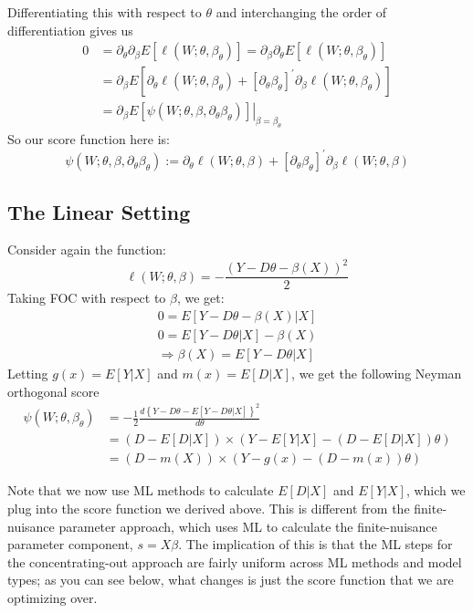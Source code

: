 \documentclass[11pt]{article}
\begin{document}
Differentiating this with respect to $\theta$ and interchanging the order of differentiation gives us
$$\begin{aligned}
0 &=\partial_{\theta} \partial_{\beta} E\left[\ell\left(W ; \theta, \beta_{\theta}\right)\right]=\partial_{\beta} \partial_{\theta} E\left[\ell\left(W ; \theta, \beta_{\theta}\right)\right] \\
&=\partial_{\beta} E\left[\partial_{\theta} \ell\left(W ; \theta, \beta_{\theta}\right)+\left[\partial_{\theta} \beta_{\theta}\right]^{\prime} \partial_{\beta} \ell\left(W ; \theta, \beta_{\theta}\right)\right] \\
&=\left.\partial_{\beta} E\left[\psi\left(W ; \theta, \beta, \partial_{\theta} \beta_{\theta}\right)\right]\right|_{\beta=\beta_{\theta}}
\end{aligned}$$
So our score function here is:
$$\psi\left(W ; \theta, \beta, \partial_{\theta} \beta_{\theta}\right):=\partial_{\theta} \ell(W ; \theta, \beta)+\left[\partial_{\theta} \beta_{\theta}\right]^{\prime} \partial_{\beta} \ell(W ; \theta, \beta)$$

\subsection{The Linear Setting}
Consider again the function:
$$\ell(W ; \theta, \beta)=-\frac{(Y-D \theta-\beta(X))^{2}}{2}$$
Taking FOC with respect to $\beta$, we get:
\begin{align*}
	0 = E[Y - D\theta - \beta(X)| X] \\
  0 = E[Y- D\theta|X] - \beta(X) \\
	\Rightarrow \beta(X) = E[Y - D\theta |X]
\end{align*}
Letting $g(x) = E[Y|X]$ and $m(x) = E[D|X]$, we get the following Neyman orthogonal score
\begin{align*}
	\psi\left(W ; \theta, \beta_{\theta}\right) &=-\frac{1}{2} \frac{d\left\{Y-D \theta-E[Y-D \theta | X]\right\}^{2}}{d \theta} \\
	&=\left(D-E[D | X]\right) \times\left(Y-E[Y | X]-\left(D-E[D | X]\right) \theta\right) \\
	&=\left(D-m(X)\right) \times\left(Y- g(x) - (D - m(x) )\theta\right)
\end{align*}

Note that we now use ML methods to calculate $E[D|X]$ and $E[Y|X]$, which we plug into the score function we derived above. This is different from the finite-nuisance parameter approach, which uses ML to calculate the finite-nuisance parameter component, $s = X\beta$. The implication of this is that the ML steps for the concentrating-out approach are fairly uniform across ML methods and model types; as you can see below, what changes is just the score function that we are optimizing over.
\end{document}
